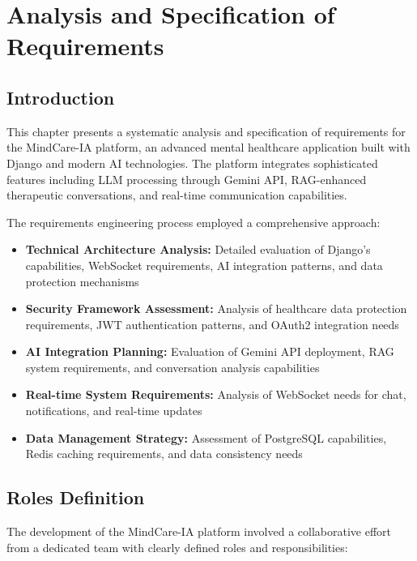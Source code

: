 \chapter{Analysis and Specification of Requirements}

\section{Introduction}
This chapter presents a systematic analysis and specification of requirements for the MindCare-IA platform, an advanced mental healthcare application built with Django and modern AI technologies. The platform integrates sophisticated features including LLM processing through Gemini API, RAG-enhanced therapeutic conversations, and real-time communication capabilities.

The requirements engineering process employed a comprehensive approach:
\begin{itemize}
    \item \textbf{Technical Architecture Analysis:} Detailed evaluation of Django's capabilities, WebSocket requirements, AI integration patterns, and data protection mechanisms
    \item \textbf{Security Framework Assessment:} Analysis of healthcare data protection requirements, JWT authentication patterns, and OAuth2 integration needs
    \item \textbf{AI Integration Planning:} Evaluation of Gemini API deployment, RAG system requirements, and conversation analysis capabilities
    \item \textbf{Real-time System Requirements:} Analysis of WebSocket needs for chat, notifications, and real-time updates
    \item \textbf{Data Management Strategy:} Assessment of PostgreSQL capabilities, Redis caching requirements, and data consistency needs
\end{itemize}

\section{Roles Definition}
The development of the MindCare-IA platform involved a collaborative effort from a dedicated team with clearly defined roles and responsibilities:

